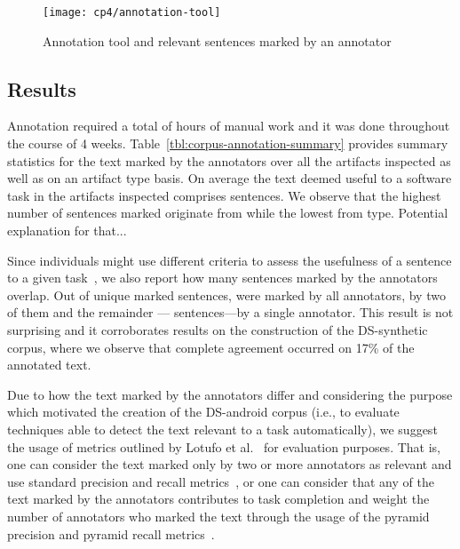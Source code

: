 \begin{figure}
    \centering
    \texttt{[image: cp4/annotation-tool]}
    \caption{Annotation tool and relevant sentences marked by an annotator}
    \label{fig:corpus-annotation-tool}
\end{figure}




\subsection{Results}


Annotation required a total of  hours of manual work and it was done throughout the course of 4 weeks.
Table~\ref{tbl:corpus-annotation-summary} provides summary statistics for the text marked by 
the annotators over all the artifacts inspected as well as on an artifact type basis.
On average the text deemed useful to a software task in the artifacts inspected comprises 
 sentences. 
We observe that the highest number of sentences marked originate from 
while the lowest from  type. Potential explanation for that...











Since individuals might use different criteria to
assess the usefulness of a sentence to a given task~\cite{Barry1994, Barry1998, Freund2015},
we also report how many sentences marked by the annotators overlap.
Out of 
unique marked
sentences, 
 were marked by all annotators,
 by two of them and the remainder
--- sentences---by a single annotator.
This result is not surprising and it corroborates 
results on the construction of the \acs{DS-synthetic} 
corpus, where we observe that complete agreement 
occurred on 17\% of the annotated text.



Due to how the text marked by the annotators differ
and considering the purpose which motivated the creation of the \acs{DS-android} corpus
(i.e., to evaluate techniques able to detect the text relevant to a task automatically),
we suggest the usage of metrics outlined by Lotufo et al.~\cite{Lotufo2012} for evaluation purposes. 
That is,
one can consider the text marked only by two or more annotators as relevant
and use standard precision and recall metrics~\cite{Manning2009IR}, or one can consider that
any of the text marked by the annotators 
contributes to task completion and weight the number of 
annotators who marked the text through the usage of the pyramid 
precision and pyramid recall metrics~\cite{Nenkova2004, Lotufo2012}. 






